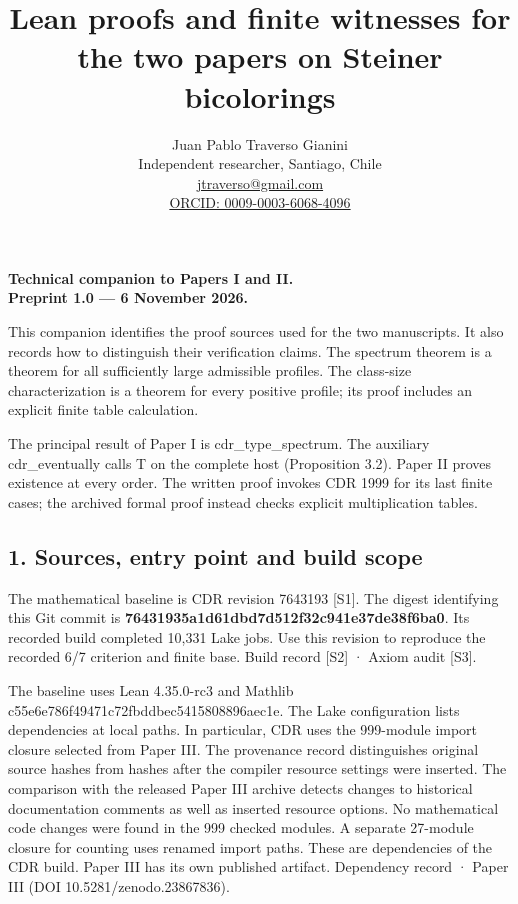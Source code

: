 \documentclass[english,11pt,a4paper]{article}
\title{Lean proofs and finite witnesses for the two papers on Steiner bicolorings}
\author{Juan Pablo Traverso Gianini\\\small Independent researcher, Santiago, Chile\\\small \href{mailto:jtraverso@gmail.com}{jtraverso@gmail.com}\\\small \href{https://orcid.org/0009-0003-6068-4096}{ORCID: 0009-0003-6068-4096}}
\date{}
\begin{document}
\raggedbottom
\maketitle
\textbf{Technical companion to Papers I and II.}\\\textbf{Preprint 1.0 — 6 November 2026.}

This companion identifies the proof sources used for the two manuscripts. It also records how to distinguish their verification claims. The spectrum theorem is a theorem for all sufficiently large admissible profiles. The class-size characterization is a theorem for every positive profile; its proof includes an explicit finite table calculation.

The principal result of Paper I is cdr\_type\_spectrum. The auxiliary cdr\_eventually calls T on the complete host (Proposition 3.2). Paper II proves existence at every order. The written proof invokes CDR 1999 for its last finite cases; the archived formal proof instead checks explicit multiplication tables.

\subsection{1. Sources, entry point and build scope}\label{sources-entry-point-and-build-scope}

The mathematical baseline is CDR revision 7643193 {[}S1{]}. The digest identifying this Git commit is \textbf{76431935a1\allowbreak{}d61dbd7d51\allowbreak{}2f32c941e3\allowbreak{}7de38f6ba0}. Its recorded build completed 10,331 Lake jobs. Use this revision to reproduce the recorded 6/7 criterion and finite base. Build record {[}S2{]} · Axiom audit {[}S3{]}.

The baseline uses Lean 4.35.0-rc3 and Mathlib c55e6e786f\allowbreak{}49471c72fb\allowbreak{}ddbec54158\allowbreak{}08896aec1e. The Lake configuration lists dependencies at local paths. In particular, CDR uses the 999-module import closure selected from Paper III. The provenance record distinguishes original source hashes from hashes after the compiler resource settings were inserted. The comparison with the released Paper III archive detects changes to historical documentation comments as well as inserted resource options. No mathematical code changes were found in the 999 checked modules. A separate 27-module closure for counting uses renamed import paths. These are dependencies of the CDR build. Paper III has its own published artifact. Dependency record · Paper III (DOI 10.5281/zenodo.23867836).
\end{document}
